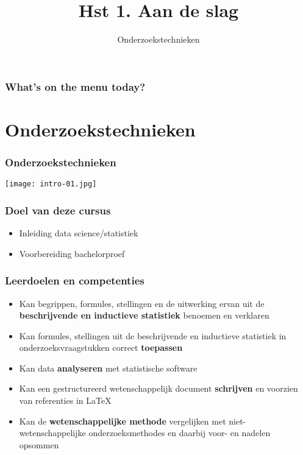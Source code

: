 \documentclass[aspectratio=169]{beamer}
\title{Hst 1. Aan de slag}
\subtitle{Onderzoekstechnieken}
\begin{document}
\begin{frame}
  \maketitle
\end{frame}

\begin{frame}
  \frametitle{What's on the menu today?}
  
  \tableofcontents
\end{frame}

\section{Onderzoekstechnieken}

\begin{frame}
  \frametitle{Onderzoekstechnieken}
  
  \centering
  \texttt{[image: intro-01.jpg]}
\end{frame}

\begin{frame}
  \frametitle{Doel van deze cursus}
  
  \begin{itemize}
    \item Inleiding data science/statistiek
    \item Voorbereiding bachelorproef
  \end{itemize}
\end{frame}

\begin{frame}
  \frametitle{Leerdoelen en competenties}
  
  \begin{itemize}
    \item Kan begrippen, formules, stellingen en de uitwerking ervan uit de \textbf{beschrijvende en inductieve statistiek} benoemen en verklaren
    \item Kan formules, stellingen uit de beschrijvende en inductieve statistiek in onderzoeksvraagstukken correct \textbf{toepassen}
    \item Kan data \textbf{analyseren} met statistische software
    \item Kan een gestructureerd wetenschappelijk document \textbf{schrijven} en voorzien van referenties in \LaTeX{}
    \item Kan de \textbf{wetenschappelijke methode} vergelijken met niet-wetenschappelijke onderzoeksmethodes en daarbij voor- en nadelen opsommen 
  \end{itemize}
\end{frame}
\end{document}
